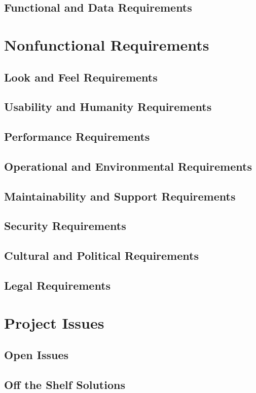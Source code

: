 \documentclass[12pt]{article}
\begin{document}
\subsection{Functional and Data Requirements}

\section{Nonfunctional Requirements}
\subsection{Look and Feel Requirements}
\subsection{Usability and Humanity Requirements}
\subsection{Performance Requirements}
\subsection{Operational and Environmental Requirements}
\subsection{Maintainability and Support Requirements}
\subsection{Security Requirements}
\subsection{Cultural and Political Requirements}
\subsection{Legal Requirements}

\section{Project Issues}
\subsection{Open Issues}
\subsection{Off the Shelf Solutions}
\end{document}
